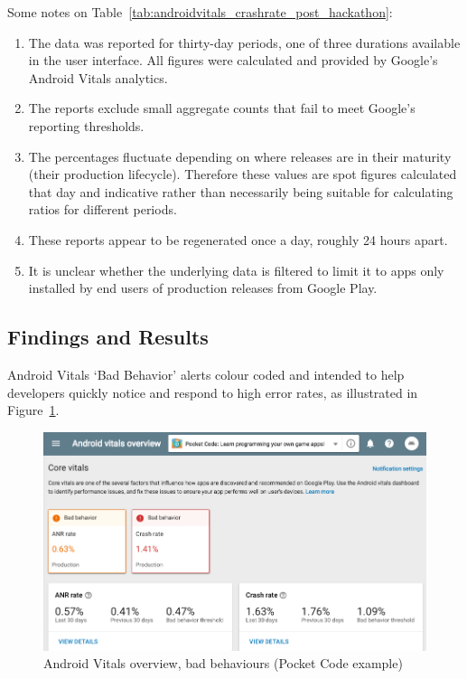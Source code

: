 Some notes on Table~\ref{tab:androidvitals_crashrate_post_hackathon}:
\begin{enumerate}
    \item The data was reported for thirty-day periods, one of three durations available in the user interface. All figures were calculated and provided by Google's Android Vitals analytics.
    \item The reports exclude small aggregate counts that fail to meet Google's reporting thresholds.
    \item The percentages fluctuate depending on where releases are in their maturity (their production lifecycle). Therefore these values are spot figures calculated that day and indicative rather than necessarily being suitable for calculating ratios for different periods.
    \item These reports appear to be regenerated once a day, roughly 24 hours apart.
    \item It is unclear whether the underlying data is filtered to limit it to apps only installed by end users of production releases from Google Play.
\end{enumerate}


\subsection{Findings and Results}
\label{catrobat-case-study-findings-and-results}

Android Vitals `Bad Behavior' alerts colour coded and intended to help developers quickly notice and respond to high error rates, as illustrated in Figure~\ref{fig:android-vitals-pocketcode-alerts-23-jan-2020}. %

\begin{figure}
    \centering
    \includegraphics[width=12cm]{images/google-play-console/android-vitals-pocketcode-alerts-23-jan-2020.png}
    \caption{Android Vitals overview, bad behaviours (Pocket Code example)}
    \label{fig:android-vitals-pocketcode-alerts-23-jan-2020}
\end{figure}


